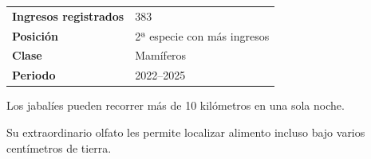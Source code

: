 \documentclass[11pt,a4paper]{article}
\begin{document}
\vspace{0.45cm}


\begin{tcolorbox}[
colback=Beige,
colframe=ForestGreen,
title=\faChartBar\ Resultados del análisis,
fonttitle=\bfseries]

\begin{tabular}{ll}

\textbf{Ingresos registrados} & 383 \\

\textbf{Posición} & 2ª especie con más ingresos \\

\textbf{Clase} & Mamíferos \\

\textbf{Periodo} & 2022--2025 \\

\end{tabular}

\end{tcolorbox}

\vspace{0.25cm}


\begin{tcolorbox}[
colback=Stone,
colframe=SoftGreen,
title=\faLightbulb\ ¿Sabías que...?,
fonttitle=\bfseries]

Los jabalíes pueden recorrer más de 10 kilómetros en una sola noche.

Su extraordinario olfato les permite localizar alimento incluso bajo
varios centímetros de tierra.

\end{tcolorbox}

\vspace{0.25cm}


\begin{flushright}


\end{flushright}
\end{document}
